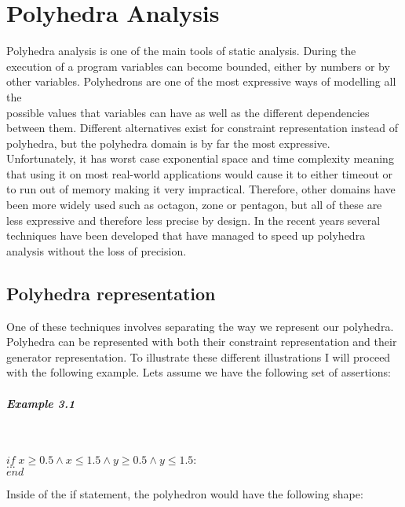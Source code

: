 
\chapter{Polyhedra Analysis}
 
Polyhedra analysis is one of the main tools of static analysis. During the\\ execution of a program variables can become bounded, either by numbers or by \\other variables. Polyhedrons are one of the most expressive ways of modelling all the\\ possible values that variables can have as well as the different dependencies between them. Different alternatives exist for constraint representation instead of polyhedra, but the polyhedra domain is by far the most expressive. Unfortunately, it has worst case exponential space and time complexity meaning that using it on most real-world applications would cause it to either timeout or to run out of memory making it very impractical. Therefore, other domains have been more widely used such as octagon, zone or pentagon, but all of these are less expressive and therefore less precise by design. In the recent years several techniques have been developed that have managed to speed up polyhedra analysis without the loss of precision.

\section{Polyhedra representation}
One of these techniques involves separating the way we represent our polyhedra. Polyhedra can be represented with both their constraint representation and their generator representation. To illustrate these different illustrations I will proceed with the following example. Lets assume we have the following set of assertions:
\paragraph{Example 3.1}\mbox{}\\
\begin{center}
	$if \; x\geq0.5\wedge x\leq 1.5 \wedge y\geq 0.5 \wedge y \leq1.5: $\\
	$...\;\;\;\;\;$\\
	$end \qquad\qquad\qquad\qquad\qquad\qquad\qquad\qquad$
\end{center}

Inside of the if statement, the polyhedron would have the following shape:


